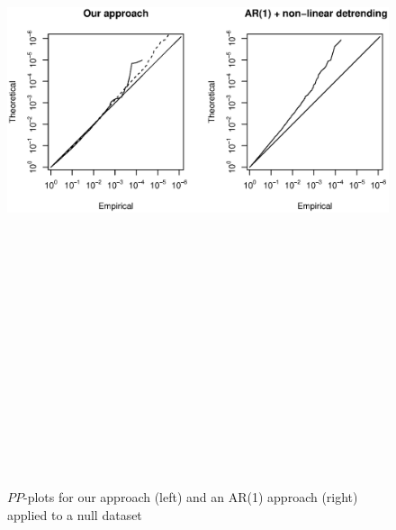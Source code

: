 \documentclass[a0,portrait]{a0poster}
\begin{document}
\begin{multicols}{3}
\begin{figure}
\includegraphics[height=220mm,bb=18 270 570 770]{null.pp.ps}
\caption{$PP$-plots for our approach (left) and an AR(1) approach (right) applied to a null dataset}
\label{pp.plots}          
\end{figure}



\end{multicols}
\end{document}
